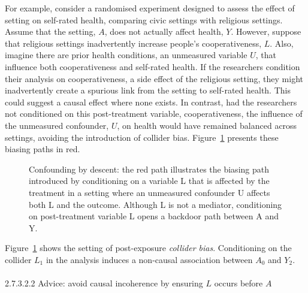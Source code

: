 \documentclass[
  singlecolumn]{article}
\makeatletter
\let\oldparagraph\paragraph
\renewcommand{\paragraph}{
    \@ifstar
      \xxxParagraphStar
      \xxxParagraphNoStar
  }
\newcommand{\xxxParagraphStar}[1]{\oldparagraph*{#1}\mbox{}}
\newcommand{\xxxParagraphNoStar}[1]{\oldparagraph{#1}\mbox{}}
\makeatother
\begin{document}
For example, consider a randomised experiment designed to assess the
effect of setting on self-rated health, comparing civic settings with
religious settings. Assume that the setting, \(A\), does not actually
affect health, \(Y\). However, suppose that religious settings
inadvertently increase people's cooperativeness, \(L\). Also, imagine
there are prior health conditions, an unmeasured variable \(U\), that
influence both cooperativeness and self-rated health. If the researchers
condition their analysis on cooperativeness, a side effect of the
religious setting, they might inadvertently create a spurious link from
the setting to self-rated health. This could suggest a causal effect
where none exists. In contrast, had the researchers not conditioned on
this post-treatment variable, cooperativeness, the influence of the
unmeasured confounder, \(U\), on health would have remained balanced
across settings, avoiding the introduction of collider bias.
Figure~\ref{fig-dag-descendant} presents these biasing paths in red.

\begin{figure}


\caption{\label{fig-dag-descendant}Confounding by descent: the red path
illustrates the biasing path introduced by conditioning on a variable L
that is affected by the treatment in a setting where an unmeasured
confounder U affects both L and the outcome. Although L is not a
mediator, conditioning on post-treatment variable L opens a backdoor
path between A and Y.}

\end{figure}%

Figure~\ref{fig-dag-descendant} shows the setting of post-exposure
\emph{collider bias}. Conditioning on the collider \(L_{1}\) in the
analysis induces a non-causal association between \(A_{0}\) and
\(Y_{2}\).

\paragraph{\texorpdfstring{2.7.3.2.2 Advice: avoid causal incoherence by
ensuring \(L\) occurs before
\(A\)}{2.7.3.2.2 Advice: avoid causal incoherence by ensuring L occurs before A}}\label{advice-avoid-causal-incoherence-by-ensuring-l-occurs-before-a-3}
\end{document}
